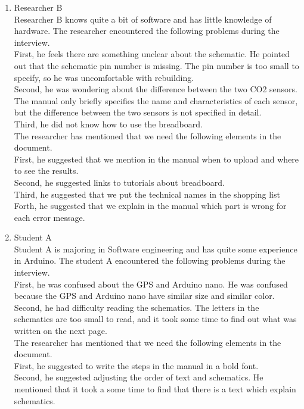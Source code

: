 \documentclass[conference]{IEEEtran}
\begin{document}
\begin{enumerate}
\begin{enumerate}
					\item Researcher B\\
					Researcher B knows quite a bit of software and has little knowledge of hardware. The researcher encountered the following problems during the interview.\\
					First, he feels there are something unclear about the schematic. 						He pointed out that the schematic pin number is missing. The pin number is too small to specify, so he was uncomfortable with rebuilding.\\
					Second, he was wondering about the difference between the two CO2 sensors. The manual only briefly specifies the name and characteristics of each sensor, but the difference between the two sensors is not specified in detail.\\
					Third, he did not know how to use the breadboard.\\
					The researcher has mentioned that we need the following elements in the document.\\
					First, he suggested that we mention in the manual when to upload and where to see the results. \\
					Second, he suggested links to tutorials about breadboard.\\
					Third, he suggested that we put the technical names in the shopping list\\
					Forth, he suggested that we explain in the manual which part is wrong for each error message.\\
					
					\item Student A\\
					Student A is majoring in Software engineering and has  quite some experience in Arduino. The student A encountered the following problems during the interview.\\
					First, he was confused about the GPS and Arduino nano. He was confused because the GPS and Arduino nano have similar size and similar color.\\
					Second, he had difficulty reading the schematics. The letters in the schematics are too small to read, and it took some time to find out what was written on the next page.\\
					The researcher has mentioned that we need the following elements in the document.\\
					First, he suggested to write the steps in the manual in a bold font.\\
					Second, he suggested adjusting the order of text and schematics. He mentioned that it took a some time to find that there is a text which explain schematics.
					

\end{enumerate}
\end{enumerate}
\end{document}
